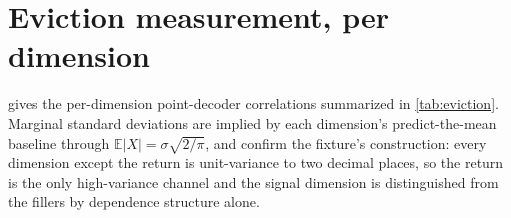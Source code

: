 
\section{Eviction measurement, per dimension}
\label{app:eviction}

 gives the per-dimension point-decoder correlations summarized in
\cref{tab:eviction}. Marginal standard deviations are implied by each dimension's
predict-the-mean baseline through $\mathbb{E}|X| = \sigma\sqrt{2/\pi}$, and confirm the fixture's
construction: every dimension except the return is unit-variance to two decimal places, so the
return is the only high-variance channel and the signal dimension is distinguished from the fillers
by dependence structure alone.

